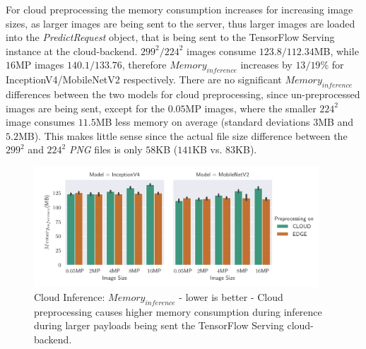 For cloud preprocessing the memory consumption increases for increasing image sizes, as larger images are being sent to the server, thus larger images are loaded into the \emph{PredictRequest} object, that is being sent to the  TensorFlow Serving instance at the cloud-backend.
$299^2/224^2$ images consume $123.8/112.34$MB, while $16$MP images $140.1/133.76$, therefore $Memory_{inference}$ increases by $13/19\%$ for InceptionV4/MobileNetV2 respectively.
There are no significant $Memory_{inference}$  differences between the two models for cloud preprocessing, since un-preprocessed images are being sent, except for the $0.05$MP images, where the smaller $224^2$ image consumes $11.5$MB less memory on average (standard deviations $3$MB and $5.2$MB).
This makes little sense since the actual file size difference between the $299^2$ and $224^2$ \emph{PNG} files is only $58$KB ($141$KB vs. $83$KB).
\begin{figure}[!htb]
\centering
\includegraphics[width=0.95\textwidth]{./Bilder/single_plots/cloud_inference_plots/Cloud_Inference_Memory.pdf}
\caption[Cloud Inference:  $Memory_{inference}$ - lower is better]{Cloud Inference:  $Memory_{inference}$ - lower is better - Cloud preprocessing causes higher memory consumption during inference during larger payloads being sent the TensorFlow Serving cloud-backend.}
\label{fig:cloudInferenceInferenceMemory}
\end{figure}
